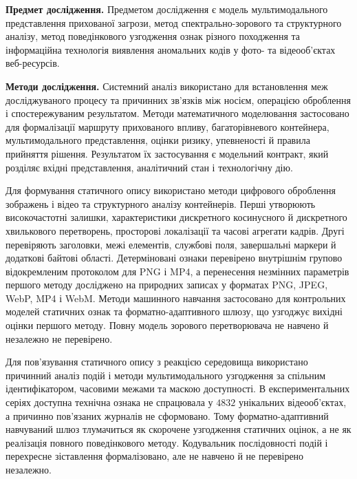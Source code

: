 \textbf{Предмет дослідження.}
Предметом дослідження є модель мультимодального представлення прихованої загрози, метод спектрально-зорового та структурного аналізу, метод поведінкового узгодження ознак різного походження та інформаційна технологія виявлення аномальних кодів у фото- та відеооб’єктах веб-ресурсів.

\textbf{Методи дослідження.}
Системний аналіз використано для встановлення меж досліджуваного процесу та причинних зв’язків між носієм, операцією оброблення і спостережуваним результатом. Методи математичного моделювання застосовано для формалізації маршруту прихованого впливу, багаторівневого контейнера, мультимодального представлення, оцінки ризику, упевненості й правила прийняття рішення. Результатом їх застосування є модельний контракт, який розділяє вхідні представлення, аналітичний стан і технологічну дію.

Для формування статичного опису використано методи цифрового оброблення зображень і відео та структурного аналізу контейнерів. Перші утворюють високочастотні залишки, характеристики дискретного косинусного й дискретного хвилькового перетворень, просторові локалізації та часові агрегати кадрів. Другі перевіряють заголовки, межі елементів, службові поля, завершальні маркери й додаткові байтові області. Детерміновані ознаки перевірено внутрішнім групово відокремленим протоколом для PNG і MP4, а перенесення незмінних параметрів першого методу досліджено на природних записах у форматах PNG, JPEG, WebP, MP4 і WebM. Методи машинного навчання застосовано для контрольних моделей статичних ознак та форматно-адаптивного шлюзу, що узгоджує вихідні оцінки першого методу. Повну модель зорового перетворювача не навчено й незалежно не перевірено.

Для пов’язування статичного опису з реакцією середовища використано причинний аналіз подій і методи мультимодального узгодження за спільним ідентифікатором, часовими межами та маскою доступності. В експериментальних серіях доступна технічна ознака не спрацювала у $4832$ унікальних відеооб’єктах, а причинно пов’язаних журналів не сформовано. Тому форматно-адаптивний навчуваний шлюз тлумачиться як скорочене узгодження статичних оцінок, а не як реалізація повного поведінкового методу. Кодувальник послідовності подій і перехресне зіставлення формалізовано, але не навчено й не перевірено незалежно.

